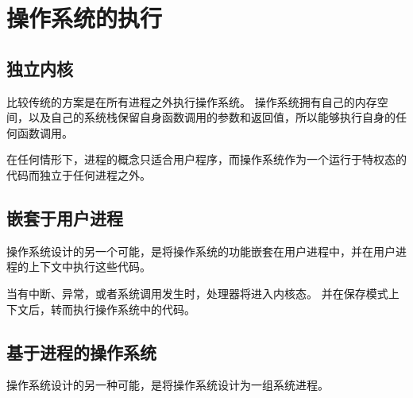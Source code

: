 
\section{操作系统的执行}
{
    \subsection{独立内核}
    {
        比较传统的方案是在所有进程之外执行操作系统。
        操作系统拥有自己的内存空间，以及自己的系统栈保留自身函数调用的参数和返回值，所以能够执行自身的任何函数调用。

        在任何情形下，进程的概念只适合用户程序，而操作系统作为一个运行于特权态的代码而独立于任何进程之外。
    }

    \subsection{嵌套于用户进程}
    {
        操作系统设计的另一个可能，是将操作系统的功能嵌套在用户进程中，并在用户进程的上下文中执行这些代码。

        当有中断、异常，或者系统调用发生时，处理器将进入内核态。
        并在保存模式上下文后，转而执行操作系统中的代码。
    }

    \subsection{基于进程的操作系统}
    {
        操作系统设计的另一种可能，是将操作系统设计为一组系统进程。
    }
}
